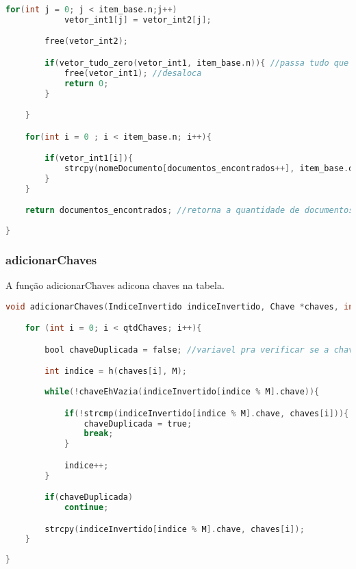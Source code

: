 \documentclass{article}
\begin{document}
\begin{lstlisting}[caption={Função consulta},label={lst:cod5},language=C]
        for(int j = 0; j < item_base.n;j++)
            vetor_int1[j] = vetor_int2[j];

        free(vetor_int2);

        if(vetor_tudo_zero(vetor_int1, item_base.n)){ //passa tudo que tem no vetor1 para 0
            free(vetor_int1); //desaloca
            return 0;
        }

    }

    for(int i = 0 ; i < item_base.n; i++){

        if(vetor_int1[i]){
            strcpy(nomeDocumento[documentos_encontrados++], item_base.documentos[i]); //copia o que tem no item_base para o nome do documentos na posicao documentos_encontrados
        }                                                                              //que inicialmente era 0
    }

    return documentos_encontrados; //retorna a quantidade de documentos encontrados que tem a chave que foi buscada
    
}

\end{lstlisting}

\subsubsection{adicionarChaves}

A função adicionarChaves adicona chaves na tabela.

\begin{lstlisting}[caption={Função adicionarChaves},label={lst:cod6},language=C]
void adicionarChaves(IndiceInvertido indiceInvertido, Chave *chaves, int qtdChaves){

    for (int i = 0; i < qtdChaves; i++){

        bool chaveDuplicada = false; //variavel pra verificar se a chave ja foi inserida anteriormente

        int indice = h(chaves[i], M); 
        
        while(!chaveEhVazia(indiceInvertido[indice % M].chave)){

            if(!strcmp(indiceInvertido[indice % M].chave, chaves[i])){
                chaveDuplicada = true;
                break;
            }

            indice++;
        }

        if(chaveDuplicada)
            continue;

        strcpy(indiceInvertido[indice % M].chave, chaves[i]);
    }
    
}

\end{lstlisting}
\end{document}

